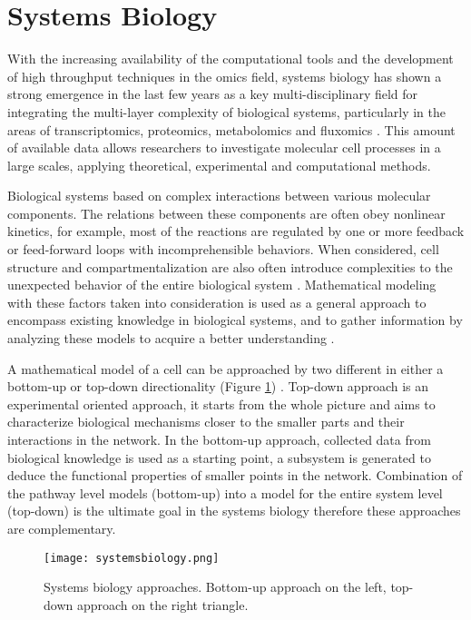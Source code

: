 \section{Systems Biology}
With the increasing availability of the computational tools and the development of high throughput techniques in the omics field, systems biology has shown a strong emergence in the last few years as a key multi-disciplinary field for integrating the multi-layer complexity of biological systems, particularly in the areas of transcriptomics, proteomics, metabolomics and fluxomics \cite{kitano2002systems}. This amount of available data allows researchers to investigate molecular cell processes in a large scales, applying theoretical, experimental and computational methods.

Biological systems based on complex interactions between various molecular components. The relations between these components are often obey nonlinear kinetics, for example, most of the reactions are regulated by one or more feedback or feed-forward loops with incomprehensible behaviors. When considered, cell structure and compartmentalization are also often introduce complexities to the unexpected behavior of the entire biological system \cite{bellouquid2006mathematical}. Mathematical modeling with these factors taken into consideration is used as a general approach to encompass existing knowledge in biological systems, and to gather information by analyzing these models to acquire a better understanding \cite{kremling2013systems}.

A mathematical model of a cell can be approached by two different in either a bottom-up or top-down directionality (Figure \ref{fig:systemsbiology}) \cite{bruggeman2007nature, shahzad2012application}. Top-down approach is an experimental oriented approach, it starts from the whole picture and aims to characterize biological mechanisms closer to the smaller parts and their interactions in the network. In the bottom-up approach, collected data from biological knowledge is used as a starting point, a subsystem is generated to deduce the functional properties of smaller points in the network. Combination of the pathway level models (bottom-up) into a model for the entire system level (top-down) is the ultimate goal in the systems biology therefore these approaches are complementary.

\begin{figure}[H]
\begin{center}
\texttt{[image: systemsbiology.png]}
\end{center}
\caption[Systems biology approaches. Bottom-up approach on the left, top-down approach on the right triangle]{Systems biology approaches. Bottom-up approach on the left, top-down approach on the right triangle\cite{kremling2013systems}.}
\label{fig:systemsbiology}
\end{figure}

